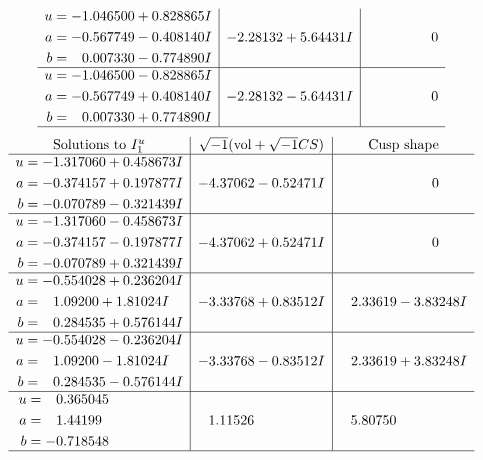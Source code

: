 \documentclass[1p]{elsarticle_modified}
\theoremstyle{definition}
\newcommand{\I}{\sqrt{-1}}
\begin{document}
$$\begin{array}{c|c|c}
\begin{aligned}
u &= -1.046500 + 0.828865 I \\
a &= -0.567749 - 0.408140 I \\
b &= \phantom{-}0.007330 - 0.774890 I\end{aligned}
 & -2.28132 + 5.64431 I & \phantom{-0.000000 } 0 \\ \hline\begin{aligned}
u &= -1.046500 - 0.828865 I \\
a &= -0.567749 + 0.408140 I \\
b &= \phantom{-}0.007330 + 0.774890 I\end{aligned}
 & -2.28132 - 5.64431 I & \phantom{-0.000000 } 0\\
 \hline 
 \end{array}$$\newpage$$\begin{array}{c|c|c}  
\text{Solutions to }I^u_{1}& \I (\text{vol} + \sqrt{-1}CS) & \text{Cusp shape}\\
 \hline 
\begin{aligned}
u &= -1.317060 + 0.458673 I \\
a &= -0.374157 + 0.197877 I \\
b &= -0.070789 - 0.321439 I\end{aligned}
 & -4.37062 - 0.52471 I & \phantom{-0.000000 } 0 \\ \hline\begin{aligned}
u &= -1.317060 - 0.458673 I \\
a &= -0.374157 - 0.197877 I \\
b &= -0.070789 + 0.321439 I\end{aligned}
 & -4.37062 + 0.52471 I & \phantom{-0.000000 } 0 \\ \hline\begin{aligned}
u &= -0.554028 + 0.236204 I \\
a &= \phantom{-}1.09200 + 1.81024 I \\
b &= \phantom{-}0.284535 + 0.576144 I\end{aligned}
 & -3.33768 + 0.83512 I & \phantom{-}2.33619 - 3.83248 I \\ \hline\begin{aligned}
u &= -0.554028 - 0.236204 I \\
a &= \phantom{-}1.09200 - 1.81024 I \\
b &= \phantom{-}0.284535 - 0.576144 I\end{aligned}
 & -3.33768 - 0.83512 I & \phantom{-}2.33619 + 3.83248 I \\ \hline\begin{aligned}
u &= \phantom{-}0.365045\phantom{ +0.000000I} \\
a &= \phantom{-}1.44199\phantom{ +0.000000I} \\
b &= -0.718548\phantom{ +0.000000I}\end{aligned}
 & \phantom{-}1.11526\phantom{ +0.000000I} & \phantom{-}5.80750\phantom{ +0.000000I}\\
 \hline 
 \end{array}$$\newpage\newpage\renewcommand{\arraystretch}{1}
\end{document}
